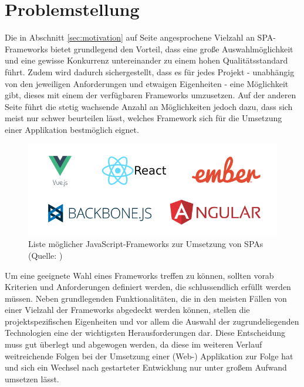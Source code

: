 \documentclass[a4paper,12pt,twoside]{scrreprt}
\begin{document}
\section{Problemstellung}
\label{sec:problemstellung}
Die in Abschnitt \ref{sec:motivation} auf Seite \pageref{sec:motivation} angesprochene Vielzahl an \ac{SPA}-Frameworks bietet grundlegend den Vorteil, dass eine große Auswahlmöglichkeit und eine gewisse Konkurrenz untereinander zu einem hohen Qualitätsstandard führt. Zudem wird dadurch sichergestellt, dass es für jedes Projekt - unabhängig von den jeweiligen Anforderungen und etwaigen Eigenheiten - eine Möglichkeit gibt, dieses mit einem der verfügbaren Frameworks umzusetzen. Auf der anderen Seite führt die stetig wachsende Anzahl an Möglichkeiten jedoch dazu, dass sich meist nur schwer beurteilen lässt, welches Framework sich für die Umsetzung einer Applikation bestmöglich eignet.

\begin{figure}[ht]
    \centering
    \includegraphics[scale=0.5]{images/js-frameworks.png}
    \caption[Liste möglicher JavaScript-Frameworks zur Umsetzung von \acsp{SPA}]{Liste möglicher JavaScript-Frameworks zur Umsetzung von \acsp{SPA} (Quelle: \cite[][]{a_best_2020})}
    \label{fig:js-frameworks}
\end{figure}

Um eine geeignete Wahl eines Frameworks treffen zu können, sollten vorab Kriterien und Anforderungen definiert werden, die schlussendlich erfüllt werden müssen. Neben grundlegenden Funktionalitäten, die in den meisten Fällen von einer Vielzahl der Frameworks abgedeckt werden können, stellen die projektspezifischen Eigenheiten und vor allem die Auswahl der zugrundeliegenden Technologien eine der wichtigsten Herausforderungen dar. Diese Entscheidung muss gut überlegt und abgewogen werden, da diese im weiteren Verlauf weitreichende Folgen bei der Umsetzung einer (Web-) Applikation zur Folge hat und sich ein Wechsel nach gestarteter Entwicklung nur unter großem Aufwand umsetzen lässt.
\end{document}

